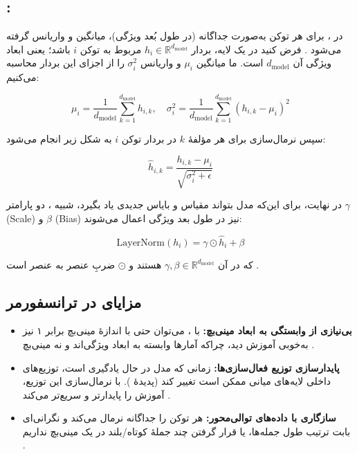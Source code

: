 \subsection*{:}
در ، برای هر توکن به‌صورت جداگانه (در طول بُعد ویژگی)، میانگین و واریانس گرفته می‌شود \cite{ba2016layer}.
فرض کنید در یک لایه، بردار \( h_i \in \mathbb{R}^{d_{\text{model}}} \) مربوط به توکن \( i \) باشد؛ یعنی ابعاد ویژگی آن \( d_{\text{model}} \) است. ما میانگین \( \mu_i \) و واریانس \( \sigma_i^2 \) را از اجزای این بردار محاسبه می‌کنیم:

\begin{equation}
	\mu_i = \frac{1}{d_{\text{model}}} \sum_{k=1}^{d_{\text{model}}} h_{i,k}, \quad
	\sigma_i^2 = \frac{1}{d_{\text{model}}} \sum_{k=1}^{d_{\text{model}}} (h_{i,k} - \mu_i)^2
	\label{eq:mean_variance}
\end{equation}


سپس نرمال‌سازی برای هر مؤلفهٔ \( k \) در بردار توکن \( i \) به شکل زیر انجام می‌شود:

\begin{equation}
	\hat{h}_{i,k} = \frac{h_{i,k} - \mu_i}{\sqrt{\sigma_i^2 + \epsilon}}
	\label{eq:normalized_h}
\end{equation}

در نهایت، برای این‌که مدل بتواند مقیاس و بایاس جدیدی یاد بگیرد، شبیه ، دو پارامتر \( \gamma \) (Scale) و \( \beta \) (Bias) نیز در طول بعد ویژگی اعمال می‌شوند:

\begin{equation}
	\text{LayerNorm}(h_i) = \gamma \odot \hat{h}_i + \beta
	\label{eq:layernorm}
\end{equation}


که در آن \( \gamma, \beta \in \mathbb{R}^{d_{\text{model}}} \) هستند و \( \odot \) ضربِ عنصر به عنصر است \cite{ba2016layer}.

\subsection*{مزایای  در ترانسفورمر}

\begin{itemize}
	\item \textbf{بی‌نیازی از وابستگی به ابعاد مینی‌بچ:}  
	با ، می‌توان حتی با اندازهٔ مینی‌بچ برابر ۱ نیز به‌خوبی آموزش دید، چراکه آمارها وابسته به ابعاد ویژگی‌اند و نه مینی‌بچ \cite{ba2016layer}.
	
	\item \textbf{پایدارسازی توزیع فعال‌سازی‌ها:}  
	زمانی که مدل در حال یادگیری است، توزیع‌های داخلی لایه‌های میانی ممکن است تغییر کند (پدیدهٔ ).  با نرمال‌سازی این توزیع، آموزش را پایدارتر و سریع‌تر می‌کند \cite{ioffe2015batch,ba2016layer}.
	
	\item \textbf{سازگاری با داده‌های توالی‌محور:}  
	هر توکن را جداگانه نرمال می‌کند و نگرانی‌ای بابت ترتیب طول جمله‌ها، یا قرار گرفتن چند جملهٔ کوتاه/بلند در یک مینی‌بچ نداریم \cite{vaswani2017attention}.
\end{itemize}

